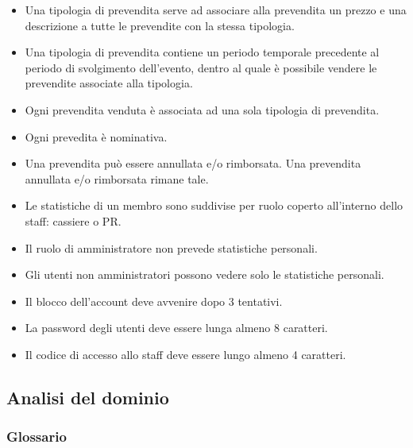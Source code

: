 \documentclass[a4paper]{article}
\begin{document}
\begin{itemize}
	\item Una tipologia di prevendita serve ad associare alla prevendita un prezzo e una descrizione a tutte le prevendite con la stessa tipologia.
	
	\item Una tipologia di prevendita contiene un periodo temporale precedente al periodo di svolgimento dell'evento, dentro al quale è possibile vendere le prevendite associate alla tipologia.
	
	\item Ogni prevendita venduta è associata ad una sola tipologia di prevendita.
	\item Ogni prevedita è nominativa.
	
	\item Una prevendita può essere annullata e/o rimborsata. Una prevendita annullata e/o rimborsata rimane tale.
	
	\item Le statistiche di un membro sono suddivise per ruolo coperto all'interno dello staff: cassiere o PR.
	\item Il ruolo di amministratore non prevede statistiche personali.
	
	\item Gli utenti non amministratori possono vedere solo le statistiche personali.	
	
    
	\item Il blocco dell'account deve avvenire dopo 3 tentativi.
	\item La password degli utenti deve essere lunga almeno 8 caratteri.
	\item Il codice di accesso allo staff deve essere lungo almeno 4 caratteri.
	
	
\end{itemize}

\newpage

\subsection{Analisi del dominio}

\subsubsection{Glossario}
\end{document}
